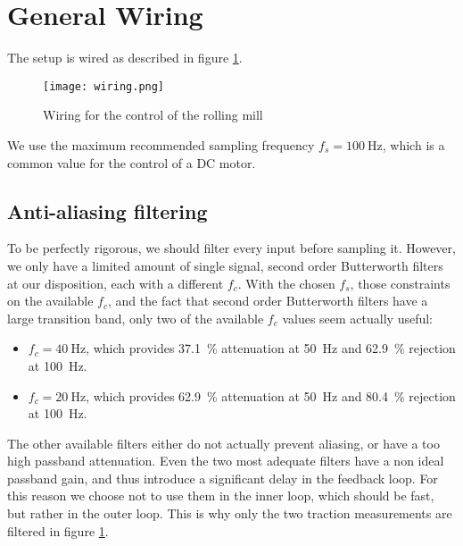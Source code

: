 \section{General Wiring}
The setup is wired as described in figure \ref{fig:wiring}.
\begin{figure}[htbp]
\centering
\texttt{[image: wiring.png]}
\caption{\label{fig:wiring}Wiring for the control of the rolling mill}
\end{figure}
We use the maximum recommended sampling frequency $f_s  = \SI{100}{\hertz}$, which is a common value for the control of a DC motor.

\subsection{Anti-aliasing filtering}
To be perfectly rigorous, we should filter every input before sampling it. However, we only have a limited amount of single signal, second order Butterworth filters at our disposition, each with a different $f_c$. With the chosen $f_s$, those constraints on the available $f_c$, and the fact that second order Butterworth filters have a large transition band, only two of the available $f_c$ values seem actually useful:
\begin{itemize}
 \item $f_c = \SI{40}{\hertz}$, which provides \SI{37.1}{\percent} attenuation at \SI{50}{\hertz} and \SI{62.9}{\percent} rejection at \SI{100}{\hertz}.
 \item $f_c = \SI{20}{\hertz}$, which provides \SI{62.9}{\percent} attenuation at \SI{50}{\hertz} and \SI{80.4}{\percent} rejection at \SI{100}{\hertz}.
\end{itemize}

The other available filters either do not actually prevent aliasing, or have a too high passband attenuation. Even the two most adequate filters have a non ideal passband gain, and thus introduce a significant delay in the feedback loop. For this reason we choose not to use them in the inner loop, which should be fast, but rather in the outer loop. This is why only the two traction measurements are filtered in figure \ref{fig:wiring}.
